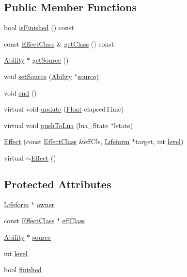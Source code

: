 \subsection*{Public Member Functions}
\begin{DoxyCompactItemize}
\item 
bool \hyperlink{classZeta_1_1Effect_a29712372704f9e84d54a0c8cb93fb3c6}{is\+Finished} () const 
\item 
const \hyperlink{classZeta_1_1EffectClass}{Effect\+Class} \& \hyperlink{classZeta_1_1Effect_aaf7157b61cedb98ae6d470d34377ef87}{get\+Class} () const 
\item 
\hyperlink{classZeta_1_1Ability}{Ability} $\ast$ \hyperlink{classZeta_1_1Effect_a8cc64ed1b22c063af761c1fcdd08ee9a}{get\+Source} ()
\item 
void \hyperlink{classZeta_1_1Effect_a4488ac8d539165fb7c3f16dd828b8962}{set\+Source} (\hyperlink{classZeta_1_1Ability}{Ability} $\ast$\hyperlink{classZeta_1_1Effect_aa4bffc23c071f21e72c577c2e16e40ee}{source})
\item 
void \hyperlink{classZeta_1_1Effect_a80384289982d02d6fe7c4764ebd9ac63}{end} ()
\item 
virtual void \hyperlink{classZeta_1_1Effect_a85a3bc561d4280c6dc042f898e2f620e}{update} (\hyperlink{namespaceZeta_a1e0a1265f9b3bd3075fb0fabd39088ba}{Float} elapsed\+Time)
\item 
virtual void \hyperlink{classZeta_1_1Effect_a48281d13dac1e240278ac7588762b8c7}{push\+To\+Lua} (lua\+\_\+\+State $\ast$lstate)
\item 
\hyperlink{classZeta_1_1Effect_a56974695a36fc3026a8cc2e2148f8736}{Effect} (const \hyperlink{classZeta_1_1EffectClass}{Effect\+Class} \&eff\+Cls, \hyperlink{classZeta_1_1Lifeform}{Lifeform} $\ast$target, int \hyperlink{classZeta_1_1Effect_aec101c1a7eda022328a0b0ebb1b10c77}{level})
\item 
virtual \hyperlink{classZeta_1_1Effect_a2322a5386a06c8354acac70d5f7ffb2c}{$\sim$\+Effect} ()
\end{DoxyCompactItemize}
\subsection*{Protected Attributes}
\begin{DoxyCompactItemize}
\item 
\hyperlink{classZeta_1_1Lifeform}{Lifeform} $\ast$ \hyperlink{classZeta_1_1Effect_a6c8500520ef68281241fd7276ea2e214}{owner}
\item 
const \hyperlink{classZeta_1_1EffectClass}{Effect\+Class} $\ast$ \hyperlink{classZeta_1_1Effect_aef82ce8a35dd7cb89ded50aa2e7dbebc}{eff\+Class}
\item 
\hyperlink{classZeta_1_1Ability}{Ability} $\ast$ \hyperlink{classZeta_1_1Effect_aa4bffc23c071f21e72c577c2e16e40ee}{source}
\item 
int \hyperlink{classZeta_1_1Effect_aec101c1a7eda022328a0b0ebb1b10c77}{level}
\item 
bool \hyperlink{classZeta_1_1Effect_ad278320e1e1434a248f9ca14347c1d32}{finished}
\end{DoxyCompactItemize}
